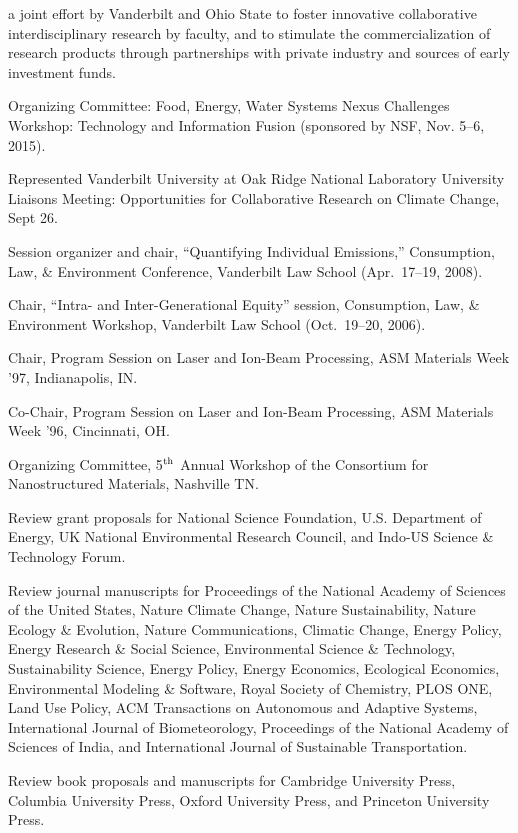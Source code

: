 a joint effort by Vanderbilt and Ohio State to foster innovative collaborative interdisciplinary research by faculty, and to stimulate the commercialization of research products through partnerships
with private industry and sources of early investment funds.
\item[2015] Organizing Committee: Food, Energy, Water Systems Nexus Challenges Workshop: Technology and Information Fusion (sponsored by NSF, Nov. 5--6, 2015).
\item[2007] Represented Vanderbilt University at Oak Ridge National Laboratory University Liaisons Meeting: Opportunities for Collaborative Research on Climate Change, Sept 26.
\item[2008] Session organizer and chair, ``Quantifying Individual Emissions,'' Consumption, Law, \& Environment Conference, Vanderbilt Law School (Apr.\ 17--19, 2008).
\item[2006] Chair, ``Intra- and Inter-Generational Equity'' session, Consumption, Law, \& Environment Workshop, Vanderbilt Law School (Oct.~19--20, 2006).
\item[1997] Chair, Program Session on Laser and Ion-Beam Processing, ASM Materials Week '97, In\-di\-an\-a\-po\-lis, IN.
\item[1996] Co-Chair, Program Session on Laser and Ion-Beam Processing, ASM Materials Week '96, Cincinnati, OH.
\item[1996] Organizing Committee, 5$^{\mbox{\scriptsize th}}$ Annual Workshop of the Consortium for Nanostructured Materials, Nashville TN.
\item[Ongoing] Review grant proposals for National Science Foundation, U.S. Department of Energy, UK National Environmental Research Council, and Indo-US Science \& Technology Forum.
\item[Ongoing] Review journal manuscripts for
    Proceedings of the National Academy of Sciences of the United States,
    Nature Climate Change,
    Nature Sustainability,
    Nature Ecology \& Evolution,
    Nature Communications,
    Climatic Change,
    Energy Policy,
    Energy Research \& Social Science,
    Environmental Science \& Technology,
    Sustainability Science,
    Energy Policy,
    Energy Economics,
    Ecological Economics,
    Environmental Modeling \& Software,
    Royal Society of Chemistry,
    PLOS ONE,
    Land Use Policy,
    ACM Transactions on Autonomous and Adaptive Systems,
    International Journal of Biometeorology,
    Proceedings of the National Academy of Sciences of India,
    and
    International Journal of Sustainable Transportation.
\item[Ongoing] Review book proposals and manuscripts for Cambridge University Press, Columbia University Press, Oxford University Press, and Princeton University Press.
